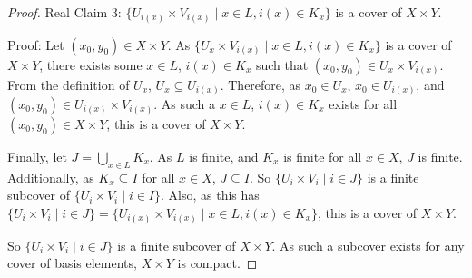 \begin{proof}{Real}
	Claim 3: $\{U_{i(x)} \times V_{i(x)} \mid x \in L, i(x) \in K_x\}$ is a cover of $X \times Y$.
	
	Proof: Let $(x_0,y_0) \in X \times Y$. As $\{U_x \times V_{i(x)} \mid x \in L, i(x) \in K_x\}$ is a cover of $X \times Y$, there exists some $x \in L$, $i(x) \in K_x$ such that $(x_0,y_0) \in U_x \times V_{i(x)}$. From the definition of $U_x$, $U_x \subseteq U_{i(x)}$. Therefore, as $x_0 \in U_x$, $x_0 \in U_{i(x)}$, and $(x_0, y_0) \in U_{i(x)} \times V_{i(x)}$. As such a $x \in L$, $i(x) \in K_x$ exists for all $(x_0, y_0) \in X \times Y$, this is a cover of $X \times Y$. 
	
	Finally, let $J = \bigcup_{x \in L} K_x$. As $L$ is finite, and $K_x$ is finite for all $x \in X$, $J$ is finite. Additionally, as $K_x \subseteq I$ for all $x \in X$, $J \subseteq I$. So $\{U_i \times V_i \mid i \in J\}$ is a finite subcover of $\{U_i \times V_i \mid i \in I\}$. Also, as this has $\{U_i \times V_i \mid i \in J\} = \{U_{i(x)} \times V_{i(x)} \mid x \in L, i(x) \in K_x\}$, this is a cover of $X \times Y$.
	
	So $\{U_i \times V_i \mid i \in J\}$ is a finite subcover of $X \times Y$. As such a subcover exists for any cover of basis elements, $X \times Y$ is compact. 
\end{proof}
